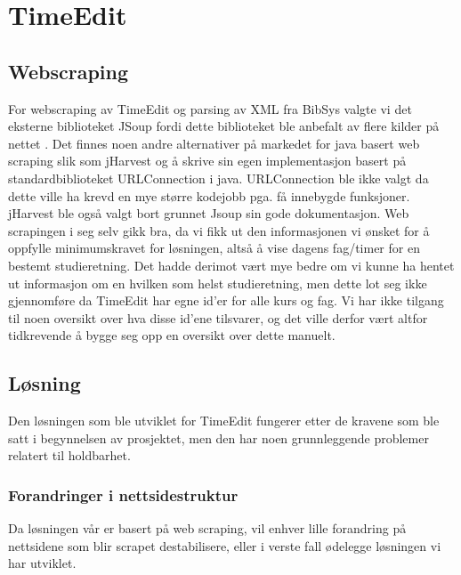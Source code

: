 \documentclass[../main.tex]{subfiles}
\begin{document}
\section{TimeEdit}

\subsection{Webscraping}

For webscraping av TimeEdit og parsing av XML fra BibSys valgte vi det eksterne biblioteket JSoup fordi dette biblioteket ble anbefalt av flere kilder på nettet   . Det finnes noen andre alternativer på markedet for java basert web scraping slik som jHarvest og å skrive sin egen implementasjon basert på standardbiblioteket URLConnection i java. URLConnection ble ikke valgt da dette ville ha krevd en mye større kodejobb pga. få innebygde funksjoner. jHarvest ble også valgt bort grunnet Jsoup sin gode dokumentasjon. \newline
Web scrapingen i seg selv gikk bra, da vi fikk ut den informasjonen vi ønsket for å oppfylle minimumskravet for løsningen, altså å vise dagens fag/timer for en bestemt studieretning. Det hadde derimot vært mye bedre om vi kunne ha hentet ut informasjon om en hvilken som helst studieretning, men dette lot seg ikke gjennomføre da TimeEdit har egne id’er for alle kurs og fag. Vi har ikke tilgang til noen oversikt over hva disse id’ene tilsvarer, og det ville derfor vært altfor tidkrevende å bygge seg opp en oversikt over dette manuelt.

\subsection{Løsning}

Den løsningen som ble utviklet for TimeEdit fungerer etter de kravene som ble satt i begynnelsen av prosjektet, men den har noen grunnleggende problemer relatert til holdbarhet.

\subsubsection{Forandringer i nettsidestruktur}

Da løsningen vår er basert på web scraping, vil enhver lille forandring på nettsidene som blir scrapet destabilisere, eller i verste fall ødelegge løsningen vi har utviklet. 
\end{document}
